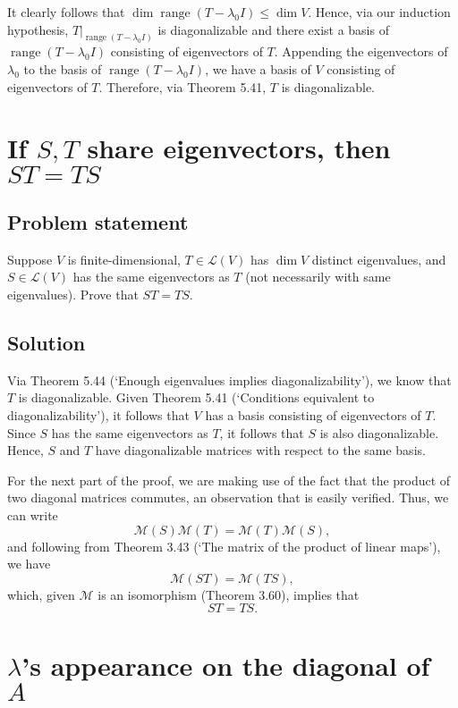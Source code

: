 \documentclass{article}
\begin{document}
It clearly follows that $\dim \operatorname{range}(T-\lambda_0 I)\leq \dim V$. 
Hence, via our induction hypothesis, $T|_{\operatorname{range}(T-\lambda_0 I)}$ is diagonalizable and there exist a basis of\newline $\operatorname{range}(T-\lambda_0 I)$ consisting of eigenvectors of $T$. 
Appending the eigenvectors of $\lambda_0$ to the basis of $\operatorname{range}(T-\lambda_0 I)$, we have a basis of $V$ consisting of eigenvectors of $T$. 
Therefore, via Theorem 5.41, $T$ is diagonalizable.

\clearpage

\section{If $S,T$ share eigenvectors, then $ST=TS$}
\subsection*{Problem statement}
Suppose $V$ is finite-dimensional, $T\in\mathcal{L}(V)$ has $\dim V$ distinct eigenvalues, and $S\in\mathcal{L}(V)$ has the same eigenvectors as $T$ (not necessarily with same eigenvalues).
Prove that $ST=TS$.

\subsection*{Solution}
Via Theorem 5.44 (`Enough eigenvalues implies diagonalizability'), we know that $T$ is diagonalizable. 
Given Theorem 5.41 (`Conditions equivalent to diagonalizability'), it follows that $V$ has a basis consisting of eigenvectors of $T$. 
Since $S$ has the same eigenvectors as $T$, it follows that $S$ is also diagonalizable. 
Hence, $S$ and $T$ have diagonalizable matrices with respect to the same basis.

For the next part of the proof, we are making use of the fact that the product of two diagonal matrices commutes, an observation that is easily verified. 
Thus, we can write
\[\mathcal{M}(S)\mathcal{M}(T)=\mathcal{M}(T)\mathcal{M}(S),\]
and following from Theorem 3.43 (`The matrix of the product of linear maps'), we have
\[\mathcal{M}(ST)=\mathcal{M}(TS),\]
which, given $\mathcal{M}$ is an isomorphism (Theorem 3.60), implies that
\[ST=TS.\]

\clearpage

\section{$\lambda$'s appearance on the diagonal of $A$}
\end{document}
